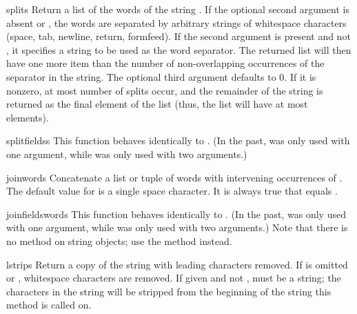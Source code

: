 \begin{funcdesc}{split}{s}
  Return a list of the words of the string .  If the optional
  second argument  is absent or , the words are
  separated by arbitrary strings of whitespace characters (space, tab, 
  newline, return, formfeed).  If the second argument  is
  present and not , it specifies a string to be used as the 
  word separator.  The returned list will then have one more item
  than the number of non-overlapping occurrences of the separator in
  the string.  The optional third argument  defaults to
  0.  If it is nonzero, at most  number of splits occur,
  and the remainder of the string is returned as the final element of
  the list (thus, the list will have at most 
  elements).
\end{funcdesc}

\begin{funcdesc}{splitfields}{s}
  This function behaves identically to .  (In the
  past,  was only used with one argument, while
   was only used with two arguments.)
\end{funcdesc}

\begin{funcdesc}{join}{words}
  Concatenate a list or tuple of words with intervening occurrences of 
  .  The default value for  is a single space
  character.  It is always true that
  equals .
\end{funcdesc}

\begin{funcdesc}{joinfields}{words}
  This function behaves identically to .  (In the past, 
   was only used with one argument, while
   was only used with two arguments.)
  Note that there is no  method on string
  objects; use the  method instead.
\end{funcdesc}

\begin{funcdesc}{lstrip}{s}
Return a copy of the string with leading characters removed.  If
 is omitted or , whitespace characters are
removed.  If given and not ,  must be a string;
the characters in the string will be stripped from the beginning of
the string this method is called on.
\end{funcdesc}

